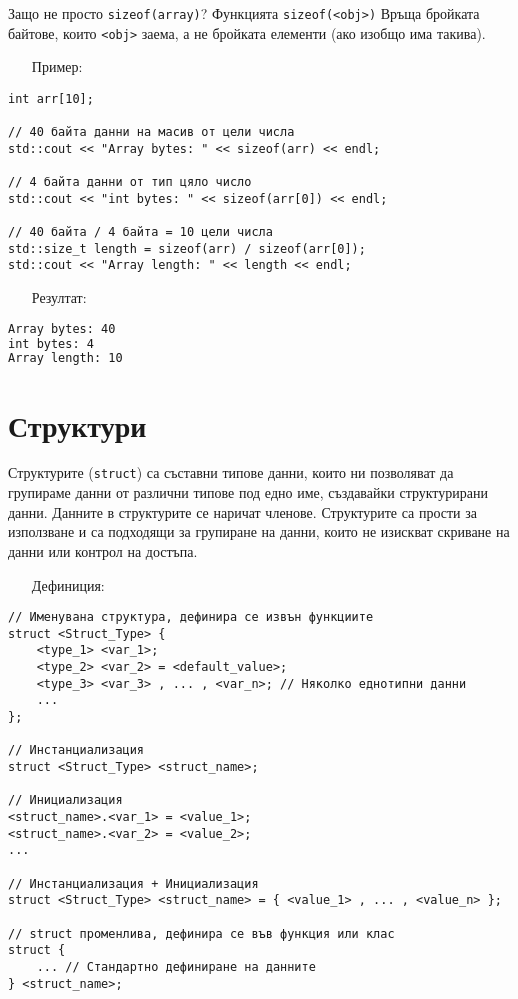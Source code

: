 \documentclass[oneside]{book}
\newcommand*{\code}[1]{\texttt{#1}}
\begin{document}
Защо не просто \code{sizeof(array)}? Функцията \code{sizeof(<obj>)} Връща бройката байтове, които \code{<obj>} заема, а не бройката елементи (ако изобщо има такива).

\begin{itemize}\item[Пример:]\end{itemize}
\begin{mdframed}\begin{lstlisting}
int arr[10];

// 40 байта данни на масив от цели числа
std::cout << "Array bytes: " << sizeof(arr) << endl;

// 4 байта данни от тип цяло число
std::cout << "int bytes: " << sizeof(arr[0]) << endl;

// 40 байта / 4 байта = 10 цели числа
std::size_t length = sizeof(arr) / sizeof(arr[0]);
std::cout << "Array length: " << length << endl;
\end{lstlisting}\end{mdframed}

\begin{itemize}\item[Резултат:]\end{itemize}
\begin{mdframed}\begin{lstlisting}[language=bash]
Array bytes: 40
int bytes: 4
Array length: 10
\end{lstlisting}\end{mdframed}

\section{Структури}
Структурите (\code{struct}) са съставни типове данни, които ни позволяват да групираме данни от различни типове под едно име, създавайки структурирани данни.
Данните в структурите се наричат членове. Структурите са прости за използване и са подходящи за групиране на данни, които не изискват скриване на данни или контрол на достъпа.
\pagebreak
\begin{itemize}\item[Дефиниция:]\end{itemize}
\begin{mdframed}\begin{lstlisting}
// Именувана структура, дефинира се извън функциите
struct <Struct_Type> {
    <type_1> <var_1>;
    <type_2> <var_2> = <default_value>;
    <type_3> <var_3> , ... , <var_n>; // Няколко еднотипни данни
    ...
};

// Инстанциализация
struct <Struct_Type> <struct_name>;

// Инициализация
<struct_name>.<var_1> = <value_1>;
<struct_name>.<var_2> = <value_2>;
...

// Инстанциализация + Инициализация
struct <Struct_Type> <struct_name> = { <value_1> , ... , <value_n> };

// struct променлива, дефинира се във функция или клас
struct {
    ... // Стандартно дефиниране на данните
} <struct_name>;
\end{lstlisting}\end{mdframed}
\end{document}
